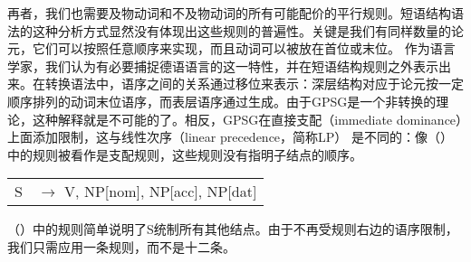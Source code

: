 \noindent
再者，我们也需要及物动词和不及物动词的所有可能配价的平行规则。短语结构语法的这种分析方式显然没有体现出这些规则的普遍性。关键是我们有同样数量的论元，它们可以按照任意顺序来实现，而且动词可以被放在首位或末位。
作为语言学家，我们认为有必要捕捉德语语言的这一特性，并在短语结构规则之外表示出来。在转换语法中，语序之间的关系通过移位来表示：深层结构对应于论元按一定顺序排列的动词末位语序，而表层语序通过\movealphac 生成。由于GPSG是一个非转换的理论，这种解释就是不可能的了。相反，GPSG在直接支配（immediate dominance）上面添加限制，这与线性次序（linear precedence，简称LP） 是不同的：像（）中的规则被看作是支配规则，这些规则没有指明子结点的顺序\citep{Pullum82a}。
\ea
\begin{tabular}[t]{@{}l@{ }l}
S  & $\to$ V, NP[nom], NP[acc], NP[dat]\\
\end{tabular}
\z
（）中的规则简单说明了S统制所有其他结点。由于不再受规则右边的语序限制，我们只需应用一条规则，而不是十二条。

